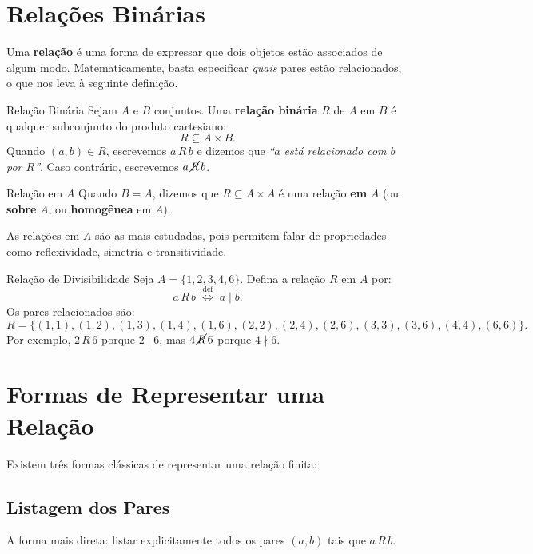 \documentclass[12pt,a4paper]{book}
\begin{document}
\section{Relações Binárias}

Uma \textbf{relação} é uma forma de expressar que dois objetos estão associados de algum modo. Matematicamente, basta especificar \emph{quais} pares estão relacionados, o que nos leva à seguinte definição.

\begin{definicao}{Relação Binária}{}
Sejam $A$ e $B$ conjuntos. Uma \textbf{relação binária} $R$ de $A$ em $B$ é qualquer subconjunto do produto cartesiano:
\[
  R \subseteq A \times B.
\]
Quando $(a, b) \in R$, escrevemos $a\,R\,b$ e dizemos que \emph{``$a$ está relacionado com $b$ por $R$''}. Caso contrário, escrevemos $a\,\cancel{R}\,b$.
\end{definicao}

\begin{definicao}{Relação em $A$}{}
Quando $B = A$, dizemos que $R \subseteq A \times A$ é uma relação \textbf{em} $A$ (ou \textbf{sobre} $A$, ou \textbf{homogênea} em $A$).
\end{definicao}

As relações em $A$ são as mais estudadas, pois permitem falar de propriedades como reflexividade, simetria e transitividade.

\begin{exemplo}{Relação de Divisibilidade}{}
Seja $A = \{1, 2, 3, 4, 6\}$. Defina a relação $R$ em $A$ por:
\[
  a\,R\,b \;\stackrel{\text{def}}{\Longleftrightarrow}\; a \mid b.
\]
Os pares relacionados são:
\[
  R = \{(1,1),(1,2),(1,3),(1,4),(1,6),(2,2),(2,4),(2,6),(3,3),(3,6),(4,4),(6,6)\}.
\]
Por exemplo, $2\,R\,6$ porque $2 \mid 6$, mas $4\,\cancel{R}\,6$ porque $4 \nmid 6$.
\end{exemplo}

\section{Formas de Representar uma Relação}

Existem três formas clássicas de representar uma relação finita:

\subsection{Listagem dos Pares}

A forma mais direta: listar explicitamente todos os pares $(a,b)$ tais que $a\,R\,b$.
\end{document}
